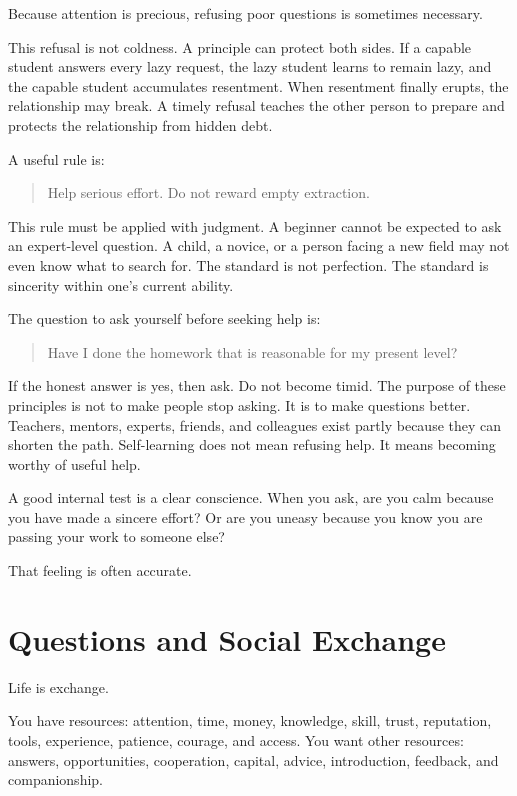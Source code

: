 Because attention is precious, refusing poor questions is sometimes necessary.

This refusal is not coldness. A principle can protect both sides. If a capable student answers every lazy request, the lazy student learns to remain lazy, and the capable student accumulates resentment. When resentment finally erupts, the relationship may break. A timely refusal teaches the other person to prepare and protects the relationship from hidden debt.

A useful rule is:

\begin{quote}
Help serious effort. Do not reward empty extraction.
\end{quote}

This rule must be applied with judgment. A beginner cannot be expected to ask an expert-level question. A child, a novice, or a person facing a new field may not even know what to search for. The standard is not perfection. The standard is sincerity within one's current ability.

The question to ask yourself before seeking help is:

\begin{quote}
Have I done the homework that is reasonable for my present level?
\end{quote}

If the honest answer is yes, then ask. Do not become timid. The purpose of these principles is not to make people stop asking. It is to make questions better. Teachers, mentors, experts, friends, and colleagues exist partly because they can shorten the path. Self-learning does not mean refusing help. It means becoming worthy of useful help.

A good internal test is a clear conscience. When you ask, are you calm because you have made a sincere effort? Or are you uneasy because you know you are passing your work to someone else?

That feeling is often accurate.

\section*{Questions and Social Exchange}

Life is exchange.

You have resources: attention, time, money, knowledge, skill, trust, reputation, tools, experience, patience, courage, and access. You want other resources: answers, opportunities, cooperation, capital, advice, introduction, feedback, and companionship.

